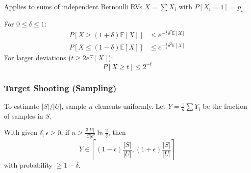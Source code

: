 Applies to sums of independent Bernoulli RVs $X = \sum X_i$ with $P[X_i=1]=p_i$.
\begin{theorem}
	For $0 \leq \delta \leq 1$:
	\begin{align*}
		P[X \geq (1+\delta)\mathbb{E}[X]] & \leq e^{-\frac{1}{3}\delta^2\mathbb{E}[X]} \\
		P[X \leq (1-\delta)\mathbb{E}[X]] & \leq e^{-\frac{1}{2}\delta^2\mathbb{E}[X]}
	\end{align*}
	For larger deviations ($t \geq 2 e \mathbb{E}[X]$):
	$$P[X \geq t] \leq 2^{-t}$$
\end{theorem}

\subsubsection{Target Shooting (Sampling)}
To estimate $|S|/|U|$, sample $n$ elements uniformly. Let $Y = \frac{1}{n} \sum Y_i$ be the fraction of samples in $S$.
\begin{theorem}
	With given $\delta, \epsilon \ge 0$, if $n \geq \frac{3 |U|}{|S| \epsilon^2} \ln \frac{2}{\delta}$, then
	$$Y \in \left[(1-\epsilon)\frac{|S|}{|U|}, (1+\epsilon)\frac{|S|}{|U|}\right]$$
	with probability $\ge 1-\delta$.
\end{theorem}
